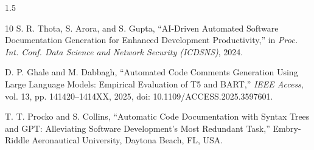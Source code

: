 \documentclass{cls/thesis}
\begin{document}
\begin{spacing}{1.5}
\begin{thebibliography}{10}
S. R. Thota, S. Arora, and S. Gupta,
``AI-Driven Automated Software Documentation Generation for Enhanced Development Productivity,''
in \emph{Proc. Int. Conf. Data Science and Network Security (ICDSNS)}, 2024.

D. P. Ghale and M. Dabbagh,
``Automated Code Comments Generation Using Large Language Models: Empirical Evaluation of T5 and BART,''
\emph{IEEE Access}, vol. 13, pp. 141420--1414XX, 2025, doi: 10.1109/ACCESS.2025.3597601.

T. T. Procko and S. Collins, ``Automatic Code Documentation with Syntax Trees and GPT: Alleviating Software Development’s Most Redundant Task,'' Embry-Riddle Aeronautical University, Daytona Beach, FL, USA.

\end{thebibliography}

% 
% 

\end{spacing}
\end{document}
